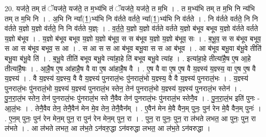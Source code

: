 \documentclass[17pt]{extarticle}
\begin{document}
20. यज॑ते॒ तम् तं ॅयज॑ते॒ यज॑ते॒ त म॒भ्य॑भि तं ॅयज॑ते॒ यज॑ते॒ त म॒भि । . त म॒भ्य॑भि तम् त म॒भि नि न्य॑भि तम् त म॒भि नि । . अ॒भि नि न्या᳚(1॒)भ्य॑भि नि व॑र्तते वर्तते॒ न्या᳚(1॒)भ्य॑भि नि व॑र्तते । . नि व॑र्तते वर्तते॒ नि नि व॑र्तते य॒ज्ञो य॒ज्ञो व॑र्तते॒ नि नि व॑र्तते य॒ज्ञ्ः । . व॒र्त॒ते॒ य॒ज्ञो य॒ज्ञो व॑र्तते वर्तते य॒ज्ञो ब॑भूव बभूव य॒ज्ञो व॑र्तते वर्तते य॒ज्ञो ब॑भूव । . य॒ज्ञो ब॑भूव बभूव य॒ज्ञो य॒ज्ञो ब॑भूव॒ स स ब॑भूव य॒ज्ञो य॒ज्ञो ब॑भूव॒ सः । . ब॒भू॒व॒ स स ब॑भूव बभूव॒ स आ स ब॑भूव बभूव॒ स आ । . स आ स स आ ब॑भूव बभू॒वा स स आ ब॑भूव । . आ ब॑भूव बभू॒वा ब॑भू॒वे तीति॑ बभू॒वा ब॑भू॒वे ति॑ । . ब॒भू॒वे तीति॑ बभूव बभू॒वे त्या॑हा॒हे ति॑ बभूव बभू॒वे त्या॑ह । . इत्या॑हा॒हे तीत्या॑है॒ष ए॒ष आ॒हे तीत्या॑है॒षः । . आ॒है॒ष ए॒ष आ॑हाहै॒ष वै वा ए॒ष आ॑हाहै॒ष वै । . ए॒ष वै वा ए॒ष ए॒ष वै य॒ज्ञ्स्य॑ य॒ज्ञ्स्य॒ वा ए॒ष ए॒ष वै य॒ज्ञ्स्य॑ । . वै य॒ज्ञ्स्य॑ य॒ज्ञ्स्य॒ वै वै य॒ज्ञ्स्य॑ पुनरालं॒भः पु॑नरालं॒भो य॒ज्ञ्स्य॒ वै वै य॒ज्ञ्स्य॑ पुनरालं॒भः । . य॒ज्ञ्स्य॑ पुनरालं॒भः पु॑नरालं॒भो य॒ज्ञ्स्य॑ य॒ज्ञ्स्य॑ पुनरालं॒भ स्तेन॒ तेन॑ पुनरालं॒भो य॒ज्ञ्स्य॑ य॒ज्ञ्स्य॑ पुनरालं॒भ स्तेन॑ । . पु॒न॒रा॒लं॒भ स्तेन॒ तेन॑ पुनरालं॒भः पु॑नरालं॒भ स्ते नै॒वैव तेन॑ पुनरालं॒भः पु॑नरालं॒भ स्तेनै॒व । . पु॒न॒रा॒लं॒भ इति॑ पुनः - आ॒लं॒भः । . तेनै॒वैव तेन॒ तेनै॒वैन॑ मेन मे॒व तेन॒ तेनै॒वैन᳚म् । . ए॒वैन॑ मेन मे॒वै वैन॒म् पुनः॒ पुन॑ रेन मे॒वै वैन॒म् पुनः॑ । . ए॒न॒म् पुनः॒ पुन॑ रेन मेन॒म् पुन॒ रा पुन॑ रेन मेन॒म् पुन॒ रा । . पुन॒ रा पुनः॒ पुन॒ रा ल॑भते लभत॒ आ पुनः॒ पुन॒ रा ल॑भते । . आ ल॑भते लभत॒ आ ल॑भ॒ते ऽन॑वरु॒द्धा ऽन॑वरुद्धा लभत॒ आ ल॑भ॒ते ऽन॑वरुद्धा । \newline
\end{document}
